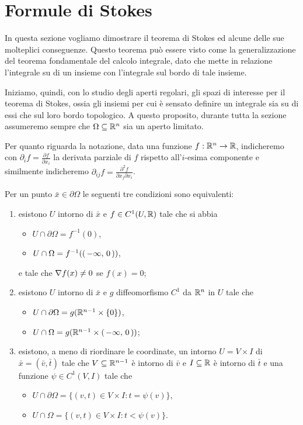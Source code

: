 \section{Formule di Stokes}\label{sezione:FormuleStokes}

In questa sezione vogliamo dimostrare il teorema di Stokes ed alcune delle sue molteplici conseguenze. Questo teorema può essere visto come la generalizzazione del teorema fondamentale del calcolo integrale, dato che mette in relazione l'integrale su di un insieme con l'integrale sul bordo di tale insieme.

Iniziamo, quindi, con lo studio degli aperti regolari, gli spazi di interesse per il teorema di Stokes, ossia gli insiemi per cui è sensato definire un integrale sia su di essi che sul loro bordo topologico. A questo proposito, durante tutta la sezione assumeremo sempre che $\Omega\subseteq\mathbb R^n$ sia un aperto limitato.

Per quanto riguarda la notazione, data una funzione $f:\mathbb R^n\to \mathbb R$, indicheremo con $\partial_i f=\frac{\partial f}{\partial x_i}$ la derivata parziale di $f$ rispetto all'$i$-esima componente e similmente indicheremo $\partial_{ij}f=\frac{\partial^2 f}{\partial x_j\partial x_i}$. 

\begin{theorem}\label{thm:PtRegEquiv}
	Per un punto $\bar x\in \partial \Omega$ le seguenti tre condizioni sono equivalenti:
	\begin{enumerate}
		\item esistono $U$ intorno di $\bar x$ e $f\in C^1(U,\mathbb R)$ tale che si abbia
			\begin{itemize}
				\item $U\cap \partial \Omega=f^{-1}(0)$,
				\item $U\cap \Omega=f^{-1}(\left(\,-\infty,\,0\,\right))$,
			\end{itemize}
			e tale che $\nabla f(x)\neq 0$ se $f(x)=0$;\label{PRE:i}
		\item esistono $U$ intorno di $\bar x$ e $g$ diffeomorfismo $C^1$ da $\mathbb R^n$ in $U$ tale che\label{PRE:ii}
			\begin{itemize}
				\item $U\cap \partial \Omega = g(\mathbb R^{n-1}\times\{0\})$,
				\item $U\cap \Omega = g(\mathbb R^{n-1}\times\left(\,-\infty,\,0\,\right))$;
			\end{itemize}
		\item esistono, a meno di riordinare le coordinate, un intorno $U=V\times I$ di $\bar x=(\bar v,\bar t)$ tale che $V\subseteq\mathbb R^{n-1}$ è intorno di $\bar v$
			e $I\subseteq\mathbb R$ è intorno di $\bar t$ e una funzione $\psi\in C^1(V,I)$ tale che
			\begin{itemize}
				\item $U\cap \partial \Omega = \{(v,t)\in V\times I: t=\psi(v)\}$,
				\item $U\cap \Omega = \{(v,t)\in V\times I:t<\psi(v)\}$.
			\end{itemize}\label{PRE:iii}
	\end{enumerate}
\end{theorem}


